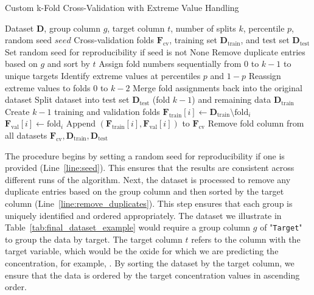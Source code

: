 \begin{algorithm}
\caption{Custom k-Fold Cross-Validation with Extreme Value Handling}
\begin{algorithmic}[1]
\Require Dataset \( \mathbf{D} \), group column \( g \), target column \( t \), number of splits \( k \), percentile \( p \), random seed \( \textit{seed} \)
\Ensure Cross-validation folds \( \mathbf{F}_\text{cv} \), training set \( \mathbf{D}_\text{train} \), and test set \( \mathbf{D}_\text{test} \)
\State \label{line:seed} Set random seed for reproducibility if \(\text{seed} \) is not None
\State \label{line:remove_duplicates} Remove duplicate entries based on \( g \) and sort by \( t \)
\State \label{line:assign_folds} Assign fold numbers sequentially from 0 to \( k-1 \) to unique targets
    \State \label{line:identify_extremes} Identify extreme values at percentiles \( p \) and \( 1-p \)
    \State \label{line:reassign_extremes} Reassign extreme values to folds \( 0 \) to \( k-2 \)
\EndIf
\State \label{line:merge_folds} Merge fold assignments back into the original dataset
\State \label{line:split_dataset} Split dataset into test set \( \mathbf{D}_\text{test} \) (fold \( k-1 \)) and remaining data \( \mathbf{D}_\text{train} \)
\State \label{line:create_folds} Create \( k-1 \) training and validation folds
    \State \( \mathbf{F}_\text{train}[i] \gets \mathbf{D}_\text{train} \setminus \text{fold}_i \)
    \State \( \mathbf{F}_\text{val}[i] \gets \text{fold}_i \)
    \State Append \((\mathbf{F}_\text{train}[i], \mathbf{F}_\text{val}[i])\) to \(\mathbf{F}_\text{cv}\)
\EndFor
\State \label{line:remove_fold_column} Remove fold column from all datasets
\State \Return \( \mathbf{F}_\text{cv}, \mathbf{D}_\text{train}, \mathbf{D}_\text{test} \)
\end{algorithmic}
\end{algorithm}

The procedure begins by setting a random seed for reproducibility if one is provided (Line~\ref{line:seed}).
This ensures that the results are consistent across different runs of the algorithm.
Next, the dataset is processed to remove any duplicate entries based on the group column and then sorted by the target column (Line~\ref{line:remove_duplicates}).
This step ensures that each group is uniquely identified and ordered appropriately.
The dataset we illustrate in Table~\ref{tab:final_dataset_example} would require a group column $g$ of "\texttt{Target}" to group the data by target.
The target column $t$ refers to the column with the target variable, which would be the oxide for which we are predicting the concentration, for example, .
By sorting the dataset by the target column, we ensure that the data is ordered by the target concentration values in ascending order.

